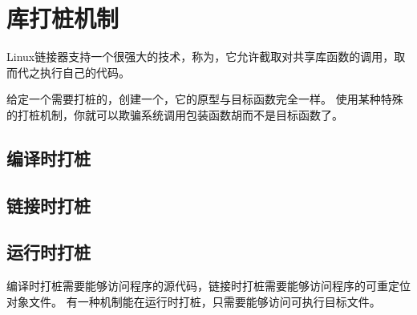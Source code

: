 
\section{库打桩机制}
{
    Linux链接器支持一个很强大的技术，称为，它允许截取对共享库函数的调用，取而代之执行自己的代码。

    给定一个需要打桩的，创建一个，它的原型与目标函数完全一样。
    使用某种特殊的打桩机制，你就可以欺骗系统调用包装函数胡而不是目标函数了。

    \subsection{编译时打桩}
    {

    }

    \subsection{链接时打桩}
    {

    }

    \subsection{运行时打桩}
    {
        编译时打桩需要能够访问程序的源代码，链接时打桩需要能够访问程序的可重定位对象文件。
        有一种机制能在运行时打桩，只需要能够访问可执行目标文件。
    }
}
